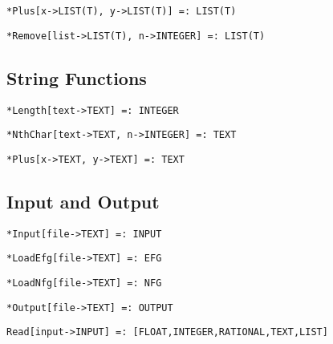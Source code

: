 \protect \large \begin{verbatim}
*Plus[x->LIST(T), y->LIST(T)] =: LIST(T)
\end{verbatim}\normalsize

\protect \large \begin{verbatim}
*Remove[list->LIST(T), n->INTEGER] =: LIST(T)
\end{verbatim}\normalsize


\medskip
\subsection{String Functions}

\protect \large \begin{verbatim}
*Length[text->TEXT] =: INTEGER
\end{verbatim}\normalsize

\protect \large \begin{verbatim}
*NthChar[text->TEXT, n->INTEGER] =: TEXT
\end{verbatim}\normalsize

\protect \large \begin{verbatim}
*Plus[x->TEXT, y->TEXT] =: TEXT
\end{verbatim} \normalsize



\medskip
\subsection{Input and Output}


\protect \large \begin{verbatim}
*Input[file->TEXT] =: INPUT
\end{verbatim}\normalsize

\protect \large \begin{verbatim}
*LoadEfg[file->TEXT] =: EFG
\end{verbatim}\normalsize

\protect \large \begin{verbatim}
*LoadNfg[file->TEXT] =: NFG
\end{verbatim}\normalsize

\protect \large \begin{verbatim}
*Output[file->TEXT] =: OUTPUT
\end{verbatim}\normalsize

\protect \large \begin{verbatim}
Read[input->INPUT] =: [FLOAT,INTEGER,RATIONAL,TEXT,LIST]
\end{verbatim}\normalsize

